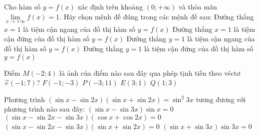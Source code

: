 \begin{ex}%
Cho hàm số $y=f(x)$ xác định trên khoảng $\left( 0;+\infty  \right)$ và thỏa mãn $\lim \limits_{x \to +\infty } f(x)=1$. Hãy chọn mệnh đề đúng trong các mệnh đề sau:
\choice
{Đường thẳng $x=1$ là tiệm cận ngang của đồ thị hàm số $y=f(x)$}
{Đường thẳng $x=1$ là tiệm cận đứng của đồ thị hàm số $y=f(x)$}
{\True Đường thẳng $y=1$ là tiệm cận ngang của đồ thị hàm số $y=f(x)$}
{Đường thẳng $y=1$ là tiệm cận đứng của đồ thị hàm số $y=f(x)$}
\end{ex}
\begin{ex}%
Điểm $M\left( -2;4 \right)$ là ảnh của điểm nào sau đây qua phép tịnh tiến theo véctơ $\overrightarrow {v} \left( -1;7 \right)$?
\choice
{$F\left( -1;-3 \right)$}
{\True $P\left( -3;11 \right)$}
{$E\left( 3;1 \right)$}
{$Q\left( 1;3 \right)$}
\end{ex}
\begin{ex}%
Phương trình $\left( \sin x-\sin 2x \right)\left( \sin x+\sin 2x \right)=\sin^2 3x$ tương đương với phương trình nào sau đây:
\choice
{$\left(\sin x-\sin 3x \right)\sin x=0$}
{$\left(\sin x-\sin 2x-\sin 3x \right)\left(\cos x+\cos 2x \right)=0$}
{$\left(\sin x-\sin 2x-\sin 3x \right)\left( \sin x+\sin 2x \right)=0$}
{\True $\left(\sin x+\sin 3x \right)\sin 3x=0$}
\end{ex}
